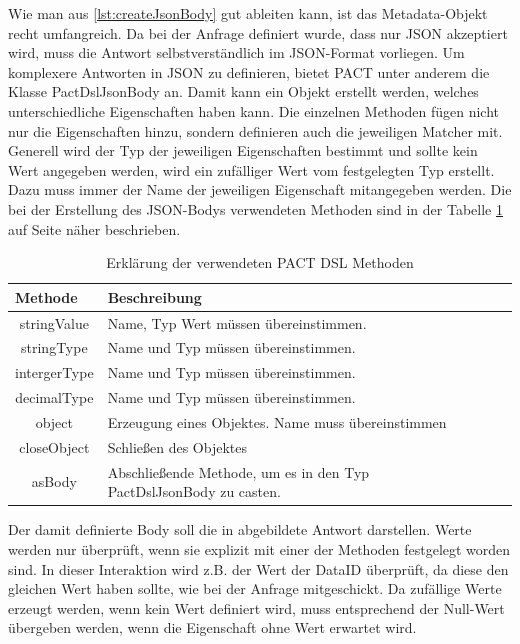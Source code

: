 \documentclass{llncs}
\begin{document}
Wie man aus \ref{lst:createJsonBody} gut ableiten kann, ist das Metadata-Objekt recht umfangreich. Da bei der Anfrage definiert wurde, dass nur JSON akzeptiert wird, muss die Antwort selbstverständlich im JSON-Format vorliegen. Um komplexere Antworten in JSON zu definieren, bietet PACT unter anderem die Klasse PactDslJsonBody an. Damit kann ein Objekt erstellt werden, welches unterschiedliche Eigenschaften haben kann. Die einzelnen Methoden fügen nicht nur die Eigenschaften hinzu, sondern definieren auch die jeweiligen Matcher mit. Generell wird der Typ der jeweiligen Eigenschaften bestimmt und sollte kein Wert angegeben werden, wird ein zufälliger Wert vom festgelegten Typ erstellt. Dazu muss immer der Name der jeweiligen Eigenschaft mitangegeben werden. Die bei der Erstellung des JSON-Bodys verwendeten Methoden sind in der Tabelle \ref{tab:Methoden_jsonBody} auf Seite \pageref{tab:Methoden_jsonBody} näher beschrieben.

\begin{table}[htbp]
\centering
\begin{tabular}{|c|l|p{4cm}|p{4cm}|}
\hline
\multicolumn{1}{|l|}{Methode} & Beschreibung \\ \hline
stringValue & Name, Typ Wert müssen übereinstimmen. \\ \hline
stringType & Name und Typ müssen übereinstimmen. \\ \hline
intergerType & Name und Typ müssen übereinstimmen. \\ \hline
decimalType & Name und Typ müssen übereinstimmen. \\ \hline
object & Erzeugung eines Objektes. Name muss übereinstimmen  \\ \hline
closeObject & Schließen des Objektes\\ \hline
asBody & Abschließende Methode, um es in den Typ PactDslJsonBody zu casten. \\ \hline
\end{tabular}
\caption{Erklärung der verwendeten PACT DSL Methoden}
\label{tab:Methoden_jsonBody}
\end{table}

Der damit definierte Body soll die in abgebildete Antwort darstellen. Werte werden nur überprüft, wenn sie explizit mit einer der Methoden festgelegt worden sind. In dieser Interaktion wird z.B. der Wert der DataID überprüft, da diese den gleichen Wert haben sollte, wie bei der Anfrage mitgeschickt. Da zufällige Werte erzeugt werden, wenn kein Wert definiert wird, muss entsprechend der Null-Wert übergeben werden, wenn die Eigenschaft ohne Wert erwartet wird.
\end{document}
